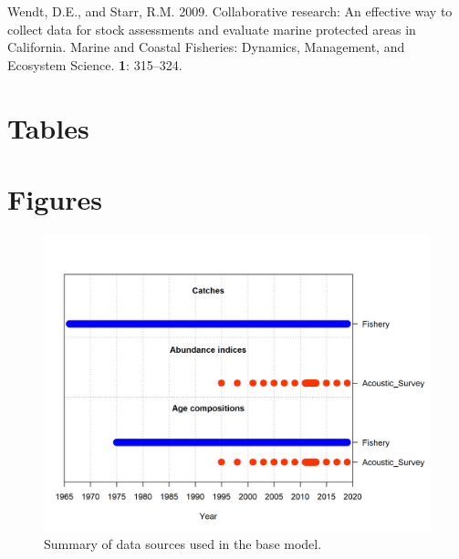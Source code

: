 \documentclass[11pt,
  english,
  letterpaper,
]{article}
\newlength{\cslhangindent}
\newenvironment{CSLReferences}[2] %
 {%
  \setlength{\parindent}{0pt}
  \ifodd #1 \everypar{\setlength{\hangindent}{\cslhangindent}}\ignorespaces\fi
  \ifnum #2 > 0
  \setlength{\parskip}{#2\baselineskip}
  \fi
 }%
 {}
\begin{document}
\begin{CSLReferences}{1}{0}
\leavevmode{}%
Wendt, D.E., and Starr, R.M. 2009. Collaborative research: An effective way to collect data for stock assessments and evaluate marine protected areas in {C}alifornia. Marine and Coastal Fisheries: Dynamics, Management, and Ecosystem Science. \textbf{1}: 315--324.

\end{CSLReferences}

\clearpage

\hypertarget{tables}{%
\section{Tables}\label{tables}}

\clearpage

\hypertarget{figures}{%
\section{Figures}\label{figures}}

\begin{figure}
\centering
\includegraphics[width=1\textwidth,height=1\textheight]{data-plot.png}
\caption{Summary of data sources used in the base model.\label{fig:data-plot}}
\end{figure}
\end{document}
